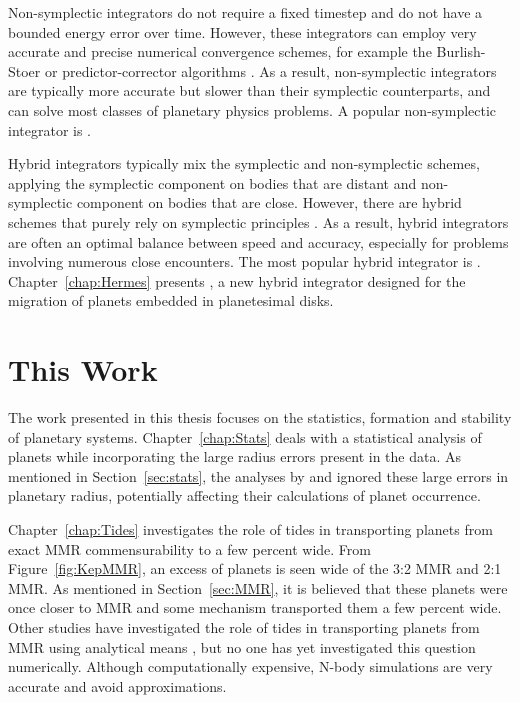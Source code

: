 Non-symplectic integrators do not require a fixed timestep and do not have a bounded energy error over time. 
However, these integrators can employ very accurate and precise numerical convergence schemes, for example the Burlish-Stoer or predictor-corrector algorithms \citep{Press2002}.
As a result, non-symplectic integrators are typically more accurate but slower than their symplectic counterparts, and can solve most classes of planetary physics problems. 
A popular non-symplectic integrator is \ias \citep{Rein2015a}.

Hybrid integrators typically mix the symplectic and non-symplectic schemes, applying the symplectic component on bodies that are distant and non-symplectic component on bodies that are close. 
However, there are hybrid schemes that purely rely on symplectic principles \citep[e.g.][]{Duncan1998}.
As a result, hybrid integrators are often an optimal balance between speed and accuracy, especially for problems involving numerous close encounters. 
The most popular hybrid integrator is \mercury \citep{Chambers1999}.
Chapter~\ref{chap:Hermes} presents \hermes, a new hybrid integrator designed for the migration of planets embedded in planetesimal disks. 

\section{This Work}
The work presented in this thesis focuses on the statistics, formation and stability of planetary systems. 
Chapter~\ref{chap:Stats} deals with a statistical analysis of \kep planets while incorporating the large radius errors present in the \kep data. 
As mentioned in Section~\ref{sec:stats}, the analyses by \citet{Fressin2013} and \citet{Petigura2013} ignored these large errors in planetary radius, potentially affecting their calculations of planet occurrence.

Chapter~\ref{chap:Tides} investigates the role of tides in transporting planets from exact MMR commensurability to a few percent wide. 
From Figure~\ref{fig:KepMMR}, an excess of planets is seen wide of the 3:2 MMR and 2:1 MMR. 
As mentioned in Section~\ref{sec:MMR}, it is believed that these planets were once closer to MMR and some mechanism transported them a few percent wide. 
Other studies have investigated the role of tides in transporting planets from MMR using analytical means \citep{Lee2013, Delisle2014}, but no one has yet investigated this question numerically.
Although computationally expensive, N-body simulations are very accurate and avoid approximations. 

